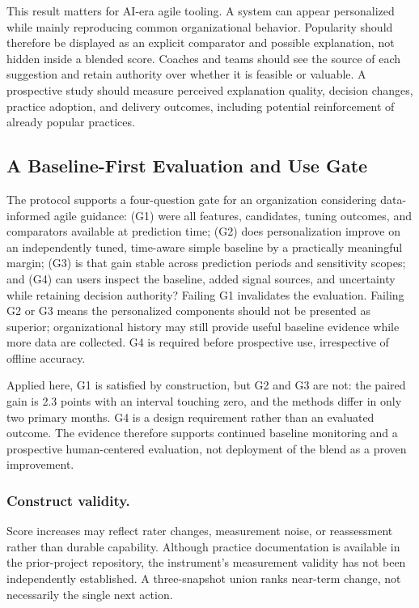 \documentclass[runningheads]{llncs}
\begin{document}
This result matters for AI-era agile tooling. A system can appear personalized while mainly reproducing common organizational behavior. Popularity should therefore be displayed as an explicit comparator and possible explanation, not hidden inside a blended score. Coaches and teams should see the source of each suggestion and retain authority over whether it is feasible or valuable. A prospective study should measure perceived explanation quality, decision changes, practice adoption, and delivery outcomes, including potential reinforcement of already popular practices.

\subsection{A Baseline-First Evaluation and Use Gate}

The protocol supports a four-question gate for an organization considering data-informed agile guidance: (G1) were all features, candidates, tuning outcomes, and comparators available at prediction time; (G2) does personalization improve on an independently tuned, time-aware simple baseline by a practically meaningful margin; (G3) is that gain stable across prediction periods and sensitivity scopes; and (G4) can users inspect the baseline, added signal sources, and uncertainty while retaining decision authority? Failing G1 invalidates the evaluation. Failing G2 or G3 means the personalized components should not be presented as superior; organizational history may still provide useful baseline evidence while more data are collected. G4 is required before prospective use, irrespective of offline accuracy.

Applied here, G1 is satisfied by construction, but G2 and G3 are not: the paired gain is 2.3 points with an interval touching zero, and the methods differ in only two primary months. G4 is a design requirement rather than an evaluated outcome. The evidence therefore supports continued baseline monitoring and a prospective human-centered evaluation, not deployment of the blend as a proven improvement.

\subsubsection{Construct validity.} Score increases may reflect rater changes, measurement noise, or reassessment rather than durable capability. Although practice documentation is available in the prior-project repository, the instrument's measurement validity has not been independently established. A three-snapshot union ranks near-term change, not necessarily the single next action.
\end{document}
